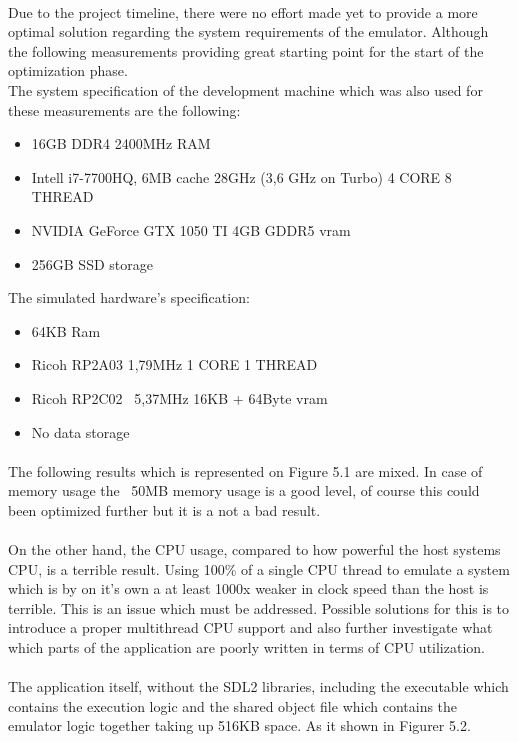 \documentclass[]{report}
\begin{document}
\paragraph{ }
Due to the project timeline, there were no effort made yet to provide a more optimal solution regarding the system requirements of the emulator. Although the following measurements providing great starting point for the start of the optimization phase.  
\\
The system specification of the development machine which was also used for these measurements are the following: 
\begin{itemize}
	\item 16GB DDR4 2400MHz RAM
	\item Intell i7-7700HQ, 6MB cache 28GHz (3,6 GHz on Turbo) 4 CORE 8 THREAD
	\item NVIDIA GeForce GTX 1050 TI 4GB GDDR5 vram
	\item 256GB SSD storage
\end{itemize}
\pagebreak
The simulated hardware's specification:
\begin{itemize}
	\item 64KB Ram
	\item Ricoh RP2A03 1,79MHz 1 CORE 1 THREAD
	\item Ricoh RP2C02 ~5,37MHz 16KB + 64Byte vram
	\item No data storage 
\end{itemize}

\paragraph{ }
The following results which is represented on Figure 5.1 are mixed. In case of memory usage the ~50MB memory usage is a good level, of course this could been optimized further but it is a not a bad result.
\paragraph{ }
 On the other hand, the CPU usage, compared to how powerful the host systems CPU, is a terrible result. Using 100\% of a single CPU thread to emulate a system which is by on it's own a at least 1000x weaker in clock speed than the host is terrible. This is an issue which must be addressed. Possible solutions for this is to introduce a proper multithread CPU support and also further investigate what which parts of the application are poorly written in terms of CPU utilization.
\paragraph{ }
The application itself, without the SDL2 libraries, including the executable which contains the execution logic and the shared object file which contains the emulator logic together taking up 516KB space. As it shown in Figurer 5.2.
\end{document}
